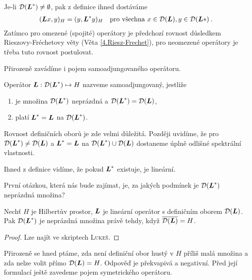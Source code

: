 \begin{remark}
Je-li $\mathcal{D}(\boldsymbol{L}^*) \neq \emptyset$, pak z definice ihned dostáváme \begin{align*}
    (\boldsymbol{L} x,y)_H =(y, \boldsymbol{L}^* y)_H \quad \text{pro všechna } x \in \mathcal{D}(\boldsymbol{L}), y \in \mathcal{D}(\boldsymbol{L}*) \:.
\end{align*}
Zatímco pro omezené (spojité) operátory je předchozí rovnost důsledkem Rieszovy-Fréchetovy věty (Věta \ref{4.Riesz-Frechet}), pro neomezené operátory je třeba tuto rovnost postulovat.
\end{remark}

Přirozeně zavádíme i pojem samoadjungovaného operátoru.

\begin{definition}
Operátor $\boldsymbol{L} : \mathcal{D}(\boldsymbol{L}^*) \mapsto H$ nazveme samoadjungovaný, jestliže \begin{enumerate}
    \item je množina $\mathcal{D}(\boldsymbol{L}^*)$ neprázdná a $\mathcal{D}(\boldsymbol{L}^*) = \mathcal{D}(\boldsymbol{L})$,
    \item platí $\boldsymbol{L}^* = \boldsymbol{L}$ na $\mathcal{D}(\boldsymbol{L}^*)$.
\end{enumerate}
\end{definition}
\begin{remark}
Rovnost definičních oborů je zde velmi důležitá. Později uvidíme, že pro $\mathcal{D}(\boldsymbol{L}^*) \neq \mathcal{D}(\boldsymbol{L})$ a $\boldsymbol{L}^* = \boldsymbol{L}$ na $\mathcal{D}(\boldsymbol{L}^*) \cup \mathcal{D}(\boldsymbol{L})$ dostaneme úplně odlišné spektrální vlastnosti.
\end{remark}
Ihned z definice vidíme, že pokud $\boldsymbol{L}^*$ existuje, je lineární.

První otázkou, která nás bude zajímat, je, za jakých podmínek je $\mathcal{D}(\boldsymbol{L}^*)$ neprázdná množina?
\begin{theorem}
Nechť $H$ je Hilbertův prostor, $\boldsymbol{L}$ je lineární operátor s definičním oborem $\mathcal{D}(\boldsymbol{L})$. Pak $\mathcal{D}(\boldsymbol{L}^*)$ je neprázdná množina právě tehdy, když $\overline{ \mathcal{D}(\boldsymbol{L}) }= H $.
\end{theorem}
\begin{proof}
Lze najít ve skriptech \textsc{Lukeš}.
\end{proof}
Přirozeně se hned ptáme, zda není definiční obor hustý v $H$ příliš malá množina a zda nelze volit přímo $ \mathcal{D}(\boldsymbol{L}) = H $. Odpověď je překvapivá a negativní. Před její formulací ještě zavedeme pojem symetrického operátoru.


